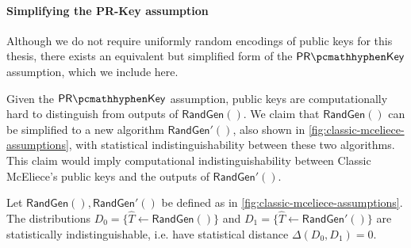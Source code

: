 \paragraph{Simplifying the PR-Key assumption}
Although we do not require uniformly random encodings of public keys for this thesis, there exists an equivalent but simplified form of the $\prkey$ assumption, which we include here.

Given the $\prkey$ assumption, public keys are computationally hard to distinguish from outputs of $\mathsf{RandGen}()$. We claim that $\mathsf{RandGen}()$ can be simplified to a new algorithm $\mathsf{RandGen}'()$, also shown in \cref{fig:classic-mceliece-assumptions}, with statistical indistinguishability between these two algorithms. This claim would imply computational indistinguishability between Classic McEliece's public keys and the outputs of $\mathsf{RandGen}'()$.

\begin{lemma} \label{lem:classic-mceliece-randgen-prime}
    Let $\mathsf{RandGen}(), \mathsf{RandGen}'()$ be defined as in \cref{fig:classic-mceliece-assumptions}.
    The distributions $D_0 = \{ \hat T \gets \mathsf{RandGen}() \}$ and $D_1 = \{ \hat T \gets \mathsf{RandGen}'() \}$ are statistically indistinguishable, i.e. have statistical distance $\Delta(D_0, D_1) = 0$.
\end{lemma}

